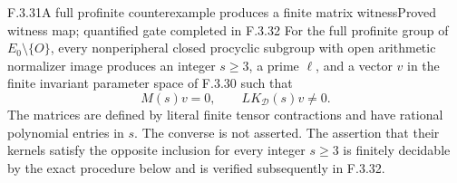 \begin{result}{F.3.31}{A full profinite counterexample produces a finite matrix witness}{Proved witness map; quantified gate completed in F.3.32}
For the full profinite group of $E_0\setminus\{O\}$, every
nonperipheral closed procyclic subgroup with open arithmetic
normalizer image produces an integer $s\geq3$, a prime $\ell$,
and a vector $v$ in the finite invariant parameter space of
F.3.30 such that
\[
 M(s)v=0,\qquad LK_{\mathcal D}(s)v\ne0.
\]
The matrices are defined by literal finite tensor contractions
and have rational polynomial entries in $s$. The converse is
not asserted. The assertion that their kernels satisfy the
opposite inclusion for every integer $s\geq3$ is finitely
decidable by the exact procedure below and is verified subsequently in F.3.32.
\end{result}
